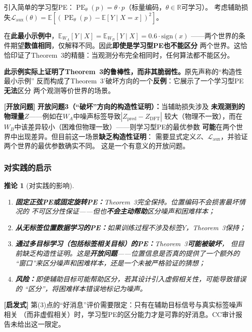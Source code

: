 \documentclass[11pt,a4paper]{article}
\newtheorem{corollary}[theorem]{推论}
\theoremstyle{remark}
\DeclareMathOperator{\PE}{PE}
\newcommand{\R}{\mathbb{R}}
\newcommand{\E}{\mathbb{E}}
\newcommand{\heuristic}{\textnormal{\textbf{[启发式]}}}
\newcommand{\openproblem}{\textnormal{\textbf{[开放问题]}}}
\begin{document}
引入简单的学习型PE：$\PE_\theta(p) = \theta \cdot p$（标量编码，$\theta \in \R$可学习）。
考虑辅助损失$\mathcal{L}_{\text{aux}}(\theta) = \E[(\PE_\theta(p) - \E[Y \mid X=x])^2]$。

在\textbf{此最小示例中}，$\E_{W_A}[Y \mid X] = \E_{W_B}[Y \mid X] = 0.6 \cdot \text{sign}(x)$
——两个世界的条件期望\textbf{数值相同}，仅解释不同。因此\textbf{即使是学习型PE也不能区分}
两个世界。这恰恰印证了Theorem~3的精髓：当观测分布完全相同时，任何算法都不能区分。

\textbf{此示例实际上证明了Theorem~3的鲁棒性，而非其脆弱性。}原先声称的``构造性最小示例''
反而构成了Theorem~3'破坏方向的一个\textbf{反例}：它展示了一个学习型PE\textbf{无法}区分
两个观测等价世界的场景。

\openproblem{} \textbf{开放问题3（``破坏''方向的构造性证明）：}当辅助损失涉及
\textbf{未观测到的物理量}$Z$——例如在$W_A$中噪声标签导致$|Z_{\text{pred}} - Z_{\text{DFT}}|$
较大（物理不一致），而在$W_B$中该差异较小（困难但物理一致）——则学习型PE的最优参数
\textbf{可能}在两个世界中出现差异。但目前这一场景\textbf{缺乏构造性证明}：
需要显式定义$Z$、$\mathcal{L}_{\text{aux}}$，并验证两个世界的最优参数确实不同。
这是一个有意义的开放问题。

\subsubsection{对实践的启示}

\begin{corollary}[对实践的影响]
\label{cor:4.4.1}
\begin{enumerate}[label=(\arabic*)]
    \item \textbf{固定正弦PE或固定旋转PE：}Theorem~3完全保持。位置编码不会损害最坏情况的
          不可区分性保证——但也\textbf{不会主动帮助}区分噪声和困难样本；
    \item \textbf{从无标签位置数据学习的PE：}如果训练过程不涉及标签$Y$，Theorem~3保持；
    \item \textbf{通过多目标学习（包括标签相关目标）的PE：}Theorem~3\textbf{可能被破坏}，
          但目前缺乏构造性证明。这是\textbf{开放问题}——位置信息是否真的提供了一个额外的
          ``窗口''来区分噪声和困难样本，还是一个未被严格验证的猜想；
    \item \textbf{风险：}即使辅助目标可能帮助区分，若其设计引入虚假相关性，可能导致错误的
          ``区分''，将困难样本错误地标记为噪声。
\end{enumerate}
\end{corollary}

\heuristic{} 第(3)点的``好消息''评价需要限定：只有在辅助目标信号与真实标签噪声相关
（而非虚假相关）时，学习型PE的区分能力才是可靠的好消息。CC审计报告未给出这一限定。
\end{document}
